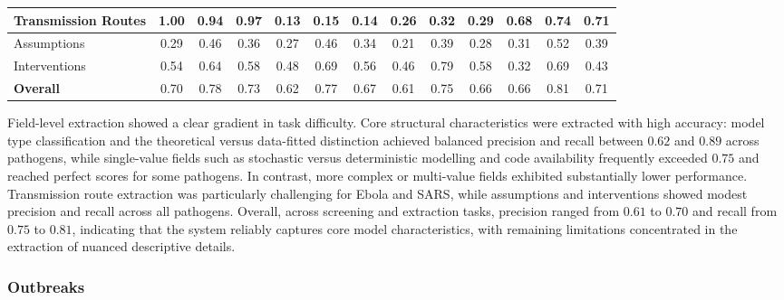 \begin{table}[b!]
{\begin{tabular}{l|cccccccccccc}
\midrule
Transmission Routes
& 1.00 & 0.94 & 0.97
& 0.13 & 0.15 & 0.14
& 0.26 & 0.32 & 0.29
& 0.68 & 0.74 & 0.71 \\
\midrule
Assumptions
& 0.29 & 0.46 & 0.36
& 0.27 & 0.46 & 0.34
& 0.21 & 0.39 & 0.28
& 0.31 & 0.52 & 0.39 \\
\midrule
Interventions
& 0.54 & 0.64 & 0.58
& 0.48 & 0.69 & 0.56
& 0.46 & 0.79 & 0.58
& 0.32 & 0.69 & 0.43 \\
\midrule
\textbf{Overall}
& 0.70 & 0.78 & 0.73
& 0.62 & 0.77 & 0.67
& 0.61 & 0.75 & 0.66
& 0.66 & 0.81 & 0.71 \\
\bottomrule
\end{tabular}
}
\end{table}

Field-level extraction showed a clear gradient in task difficulty. Core structural characteristics were extracted with high accuracy: model type classification and the theoretical versus data-fitted distinction achieved balanced precision and recall between $0.62$ and $0.89$ across pathogens, while single-value fields such as stochastic versus deterministic modelling and code availability frequently exceeded $0.75$ and reached perfect scores for some pathogens. In contrast, more complex or multi-value fields exhibited substantially lower performance. Transmission route extraction was particularly challenging for Ebola and SARS, while assumptions and interventions showed modest precision and recall across all pathogens. Overall, across screening and extraction tasks, precision ranged from $0.61$ to $0.70$ and recall from $0.75$ to $0.81$, indicating that the system reliably captures core model characteristics, with remaining limitations concentrated in the extraction of nuanced descriptive details.




\subsubsection*{Outbreaks}


